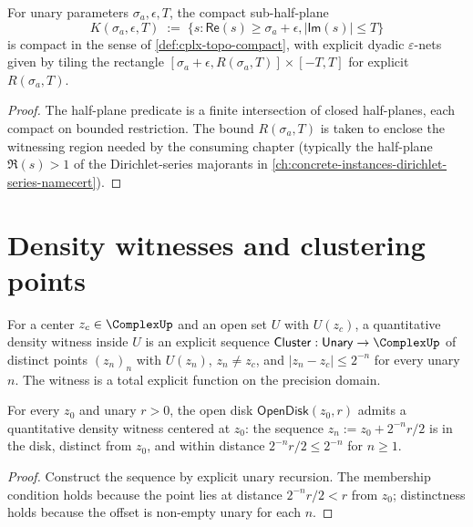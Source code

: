 \begin{theorem}
\label{thm:cplx-topo-half-plane-compact}
For unary parameters \(\sigma_a, \epsilon, T\), the compact sub-half-plane
$$
K(\sigma_a, \epsilon, T) \;:=\; \{ s : \mathsf{Re}(s) \geq \sigma_a + \epsilon, |\mathsf{Im}(s)| \leq T \}
$$
is compact in the sense of \autoref{def:cplx-topo-compact}, with explicit dyadic \(\varepsilon\)-nets given by tiling the rectangle \([\sigma_a + \epsilon, R(\sigma_a, T)] \times [-T, T]\) for explicit \(R(\sigma_a, T)\).
\end{theorem}
\begin{proof}
The half-plane predicate is a finite intersection of closed half-planes, each compact on bounded restriction. The bound \(R(\sigma_a, T)\) is taken to enclose the witnessing region needed by the consuming chapter (typically the half-plane \(\Re(s) > 1\) of the Dirichlet-series majorants in \autoref{ch:concrete-instances-dirichlet-series-namecert}).
\end{proof}

\section{Density witnesses and clustering points}
\label{sec:cplx-topo-density}

\begin{definition}
\label{def:cplx-topo-density}
For a center \(z_c \in \ComplexUp\) and an open set \(U\) with \(U(z_c)\), a quantitative density witness inside \(U\) is an explicit sequence \(\mathsf{Cluster} : \mathsf{Unary} \to \ComplexUp\) of distinct points \((z_n)_n\) with \(U(z_n)\), \(z_n \neq z_c\), and \(|z_n - z_c| \leq 2^{-n}\) for every unary \(n\). The witness is a total explicit function on the precision domain.
\end{definition}

\begin{theorem}
\label{thm:cplx-topo-open-disk-clustering}
For every \(z_0\) and unary \(r > 0\), the open disk \(\mathsf{OpenDisk}(z_0, r)\) admits a quantitative density witness centered at \(z_0\): the sequence \(z_n := z_0 + 2^{-n} r / 2\) is in the disk, distinct from \(z_0\), and within distance \(2^{-n} r / 2 \leq 2^{-n}\) for \(n \geq 1\).
\end{theorem}
\begin{proof}
Construct the sequence by explicit unary recursion. The membership condition holds because the point lies at distance \(2^{-n} r / 2 < r\) from \(z_0\); distinctness holds because the offset is non-empty unary for each \(n\).
\end{proof}

